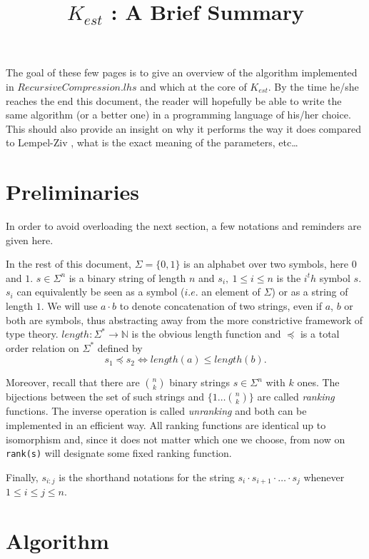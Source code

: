 \documentclass[12pt]{amsart}
\title{$K_{est}$ : A Brief Summary}
\author{}
\date{}
\theoremstyle{definition}
\theoremstyle{remark}
\theoremstyle{definition}
\theoremstyle{remark}
\begin{document}
	\maketitle

	The goal of these few pages is to give an overview of the algorithm implemented in $RecursiveCompression.lhs$ and which at the core
	of $K_{est}$. By the time he/she reaches the end this document, the reader will hopefully be able to write the same algorithm (or a better one) in a programming 
	language of his/her choice. This should also provide an insight on why it performs the way it does compared to Lempel-Ziv \cite{LZ},
	what is the exact meaning of the parameters, etc\dots

	\section*{Preliminaries}

		In order to avoid overloading the next section, a few notations and reminders are given here.

		In the rest of this document, $\Sigma = \{0,1\}$ is an alphabet over two symbols, here $0$ and $1$. $s \in \Sigma^n$ is a binary string
		of length $n$ and $s_i,~1 \leq i \leq n$ is the $i^th$ symbol $s$. $s_i$ can equivalently be seen as a symbol ($i.e.$ an element
		of $\Sigma$) or as a string of length $1$. We will use $a \cdot b$ to denote concatenation of two strings, even if $a$, $b$ or both 
		are symbols, thus abstracting away from the more constrictive framework of type theory. $length : \Sigma^\ast \to \mathbb{N}$ is
		the obvious length function and $\preceq$ is a total order relation on
		$\Sigma^\ast$ defined by
		\[ s_1 \preceq s_2 \Leftrightarrow length(a) \leq length(b).\]
		
		Moreover, recall that there are ${n \choose k}$ binary strings $s \in \Sigma^n$ with $k$ ones. The bijections between
		the set of such strings and $\{1\dots {n \choose k}\}$ are called \emph{ranking} functions. The inverse operation is called
		\emph{unranking} and both can be implemented in an efficient way. All ranking functions are identical up to 
		isomorphism and, since it does not matter which one we choose, from now on \texttt{rank(s)} will designate some fixed ranking function.

		Finally, $s_{i:j}$ is the shorthand notations
		for the string $s_i \cdot s_{i+1} \cdot \dots \cdot s_{j}$ whenever $1 \leq i \leq j \leq n$.

		\section*{Algorithm}
\end{document}

